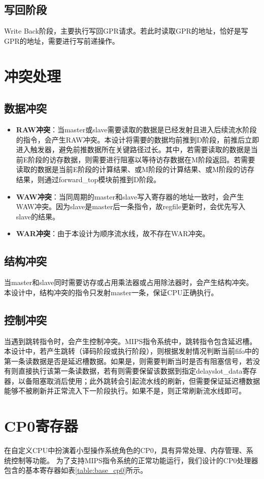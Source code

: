 \subsection{写回阶段}
Write Back阶段，主要执行写回GPR请求。若此时读取GPR的地址，恰好是写GPR的地址，需要进行写前递操作。

\section{冲突处理}
\subsection{数据冲突}
\begin{itemize}
    \item \textbf{RAW冲突}：当master或slave需要读取的数据是已经发射且进入后续流水阶段的指令，会产生RAW冲突。本设计将需要的数据均前推到D阶段，前推后立即进入触发器，避免前推数据所在关键路径过长。其中，若需要读取的数据是当前E阶段的访存数据，则需要进行阻塞以等待访存数据在M阶段返回。若需要读取的数据是当前E阶段的计算结果、或M阶段的计算结果、或M阶段的访存结果，则通过forward\_top模块前推到D阶段。
    \item \textbf{WAW冲突}：当同周期的master和slave写入寄存器的地址一致时，会产生WAW冲突。因为slave是master后一条指令，故regfile更新时，会优先写入slave的结果。
    \item \textbf{WAR冲突}：由于本设计为顺序流水线，故不存在WAR冲突。
\end{itemize}

\subsection{结构冲突}
当master和slave同时需要访存或占用乘法器或占用除法器时，会产生结构冲突。本设计中，结构冲突的指令只发射master一条，保证CPU正确执行。

\subsection{控制冲突}
当遇到跳转指令时，会产生控制冲突。MIPS指令系统中，跳转指令包含延迟槽。本设计中，若产生跳转（译码阶段或执行阶段），则根据发射情况判断当前fifo中的第一条读数据是否是延迟槽数据。如果是，则需要判断当时是否有阻塞信号，若没有则直接执行该第一条读数据，若有则需要保留该数据到指定delayslot\_data寄存器，以备阻塞取消后使用；此外跳转会引起流水线的刷新，但需要保证延迟槽数据能够不被刷新并正常流入下一阶段执行。如果不是，则正常刷新流水线即可。

\section{CP0寄存器}
在自定义CPU中扮演着小型操作系统角色的CP0，具有异常处理、内存管理、系统控制等功能。
为了支持MIPS指令系统的正常功能运行，我们设计的CP0处理器包含的基本寄存器如表\ref{table:base_cp0}所示。

